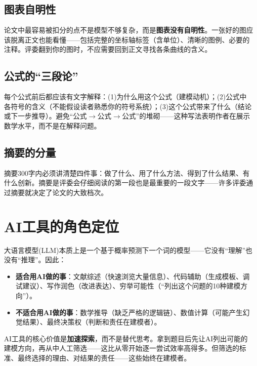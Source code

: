 \documentclass[12pt,a4paper]{ctexart}
\begin{document}
\subsection{图表自明性}

论文中最容易被扣分的点不是模型不够复杂，而是\textbf{图表没有自明性}。一张好的图应该脱离正文也能看懂——包括完整的坐标轴标签（含单位）、清晰的图例、必要的注释。评委翻到你的图时，不应需要回到正文寻找各条曲线的含义。

\subsection{公式的``三段论''}

每个公式前后都应该有文字解释：(1)为什么用这个公式（建模动机）；(2)公式中各符号的含义（不能假设读者熟悉你的符号系统）；(3)这个公式带来了什么（结论或下一步推导）。避免``公式$\to$公式$\to$公式''的堆砌——这种写法表明作者在展示数学水平，而不是在解释问题。

\subsection{摘要的分量}

摘要300字内必须讲清楚四件事：做了什么、用了什么方法、得到了什么结果、有什么创新。摘要是评委会仔细阅读的第一段也是最重要的一段文字——许多评委通过摘要就决定了论文的大致档次。

\section{AI工具的角色定位}

大语言模型(LLM)本质上是一个基于概率预测下一个词的模型——它没有``理解''也没有``推理''。因此：
\begin{itemize}[nosep]
    \item \textbf{适合用AI做的事}：文献综述（快速浏览大量信息）、代码辅助（生成模板、调试建议）、写作润色（改进表达）、穷举可能性（``列出这个问题的10种建模方向''）。
    \item \textbf{不适合用AI做的事}：数学推导（缺乏严格的逻辑链）、数值计算（可能产生幻觉结果）、最终决策权（判断和责任在建模者）。
\end{itemize}

AI工具的核心价值是\textbf{加速探索}，而不是替代思考。拿到题目后先让AI列出可能的建模方向，再从中人工筛选——这比从零开始逐一尝试效率高得多。但筛选的标准、最终选择的理由、对结果的责任——这些始终在建模者。

\end{document}
